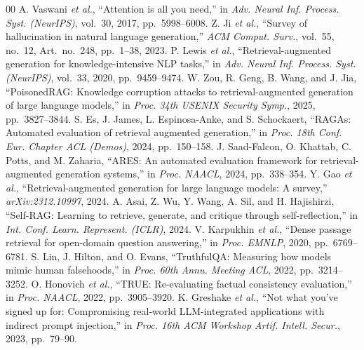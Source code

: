 \begin{thebibliography}{00}
 A. Vaswani \emph{et al.}, ``Attention is all you need,'' in \emph{Adv. Neural Inf. Process. Syst. (NeurIPS)}, vol.~30, 2017, pp.~5998--6008.
 Z. Ji \emph{et al.}, ``Survey of hallucination in natural language generation,'' \emph{ACM Comput. Surv.}, vol.~55, no.~12, Art.~no.~248, pp.~1--38, 2023.
 P. Lewis \emph{et al.}, ``Retrieval-augmented generation for knowledge-intensive NLP tasks,'' in \emph{Adv. Neural Inf. Process. Syst. (NeurIPS)}, vol.~33, 2020, pp.~9459--9474.
 W. Zou, R. Geng, B. Wang, and J. Jia, ``PoisonedRAG: Knowledge corruption attacks to retrieval-augmented generation of large language models,'' in \emph{Proc. 34th USENIX Security Symp.}, 2025, pp.~3827--3844.
 S. Es, J. James, L. Espinosa-Anke, and S. Schockaert, ``RAGAs: Automated evaluation of retrieval augmented generation,'' in \emph{Proc. 18th Conf. Eur. Chapter ACL (Demos)}, 2024, pp.~150--158.
 J. Saad-Falcon, O. Khattab, C. Potts, and M. Zaharia, ``ARES: An automated evaluation framework for retrieval-augmented generation systems,'' in \emph{Proc. NAACL}, 2024, pp.~338--354.
 Y. Gao \emph{et al.}, ``Retrieval-augmented generation for large language models: A survey,'' \emph{arXiv:2312.10997}, 2024.
 A. Asai, Z. Wu, Y. Wang, A. Sil, and H. Hajishirzi, ``Self-RAG: Learning to retrieve, generate, and critique through self-reflection,'' in \emph{Int. Conf. Learn. Represent. (ICLR)}, 2024.
 V. Karpukhin \emph{et al.}, ``Dense passage retrieval for open-domain question answering,'' in \emph{Proc. EMNLP}, 2020, pp.~6769--6781.
 S. Lin, J. Hilton, and O. Evans, ``TruthfulQA: Measuring how models mimic human falsehoods,'' in \emph{Proc. 60th Annu. Meeting ACL}, 2022, pp.~3214--3252.
 O. Honovich \emph{et al.}, ``TRUE: Re-evaluating factual consistency evaluation,'' in \emph{Proc. NAACL}, 2022, pp.~3905--3920.
 K. Greshake \emph{et al.}, ``Not what you've signed up for: Compromising real-world LLM-integrated applications with indirect prompt injection,'' in \emph{Proc. 16th ACM Workshop Artif. Intell. Secur.}, 2023, pp.~79--90.

\end{thebibliography}
